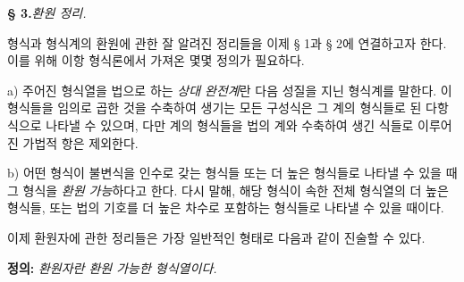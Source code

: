 
\begin{center}
\textbf{§ 3.}\quad \emph{환원 정리.}
\end{center}

형식과 형식계의 환원에 관한 잘 알려진 정리들을 이제 § 1과 § 2에 연결하고자 한다. 이를 위해 이항 형식론에서 가져온 몇몇 정의가 필요하다.

a) 주어진 형식열을 법으로 하는 \emph{상대 완전계}란 다음 성질을 지닌 형식계를 말한다. 이 형식들을 임의로 곱한 것을 수축하여 생기는 모든 구성식은 그 계의 형식들로 된 다항식으로 나타낼 수 있으며, 다만 계의 형식들을 법의 계와 수축하여 생긴 식들로 이루어진 가법적 항은 제외한다.

b) 어떤 형식이 불변식을 인수로 갖는 형식들 또는 \glqq{}더 높은 형식들\grqq{}로 나타낼 수 있을 때 그 형식을 \emph{환원 가능}하다고 한다. 다시 말해, 해당 형식이 속한 전체 형식열의 더 높은 형식들, 또는 법의 기호를 더 높은 차수로 포함하는 형식들로 나타낼 수 있을 때이다.

이제 환원자에 관한 정리들은 가장 일반적인 형태로 다음과 같이 진술할 수 있다.

\textbf{정의:} \emph{환원자란 환원 가능한 형식열이다.}
